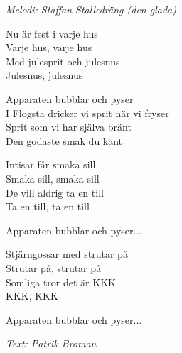 {\footnotesize\textit{Melodi: Staffan Stalledräng (den glada)}}\par
\vspace{10pt}
Nu är fest i varje hus\\
Varje hus, varje hus\\
Med julesprit och julesnus\\
Julesnus, julesnus\par
\vspace{10pt}
Apparaten bubblar och pyser\\
I Flogsta dricker vi sprit när vi fryser\\
Sprit som vi har själva bränt\\
Den godaste smak du känt\par
\vspace{10pt}
Intisar får smaka sill\\
Smaka sill, smaka sill\\
De vill aldrig ta en till\\
Ta en till, ta en till\par
\vspace{10pt}
Apparaten bubblar och pyser...\par
\vspace{10pt}
Stjärngossar med strutar på\\
Strutar på, strutar på\\
Somliga tror det är KKK\\
KKK, KKK\par
\vspace{10pt}
Apparaten bubblar och pyser...\par
\vspace{10pt}
{\footnotesize\textit{Text: Patrik Broman}}
